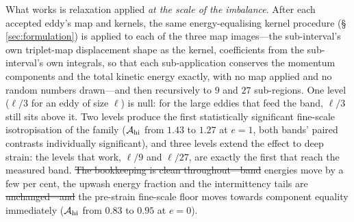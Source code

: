 \documentclass[lineno]{JFM-FLM_Au}
\providecommand{\DIFadd}[1]{{\protect\color{blue}\uwave{#1}}} %
\providecommand{\DIFdel}[1]{{\protect\color{red}\sout{#1}}} %
\providecommand{\DIFaddbegin}{} %
\providecommand{\DIFaddend}{} %
\providecommand{\DIFdelbegin}{} %
\providecommand{\DIFdelend}{} %
\begin{document}
What works is relaxation applied \emph{at the scale of the imbalance}.
After each accepted eddy's map and kernels, the same energy-equalising
kernel procedure (\S\,\ref{sec:formulation}) is applied to each of the
three map images---the sub-interval's own triplet-map displacement shape
as the kernel, coefficients from the sub-interval's own integrals, so
that each sub-application conserves the momentum components and the total
kinetic energy exactly, with no map applied and no random numbers
drawn---and then recursively to $9$ and $27$ sub-regions. One level
($\ell/3$ for an eddy of size $\ell$) is null: for the large eddies that
feed the band, $\ell/3$ still sits above it. Two levels produce the first
statistically significant fine-scale isotropisation of the family
($\mathcal A_{\rm hi}$ from $1.43$ to $1.27$ at $e=1$, both bands'
paired contrasts individually significant), and three levels extend the
effect to deep strain: the levels that work, $\ell/9$ and $\ell/27$, are
exactly the first that reach the measured band. \DIFdelbegin \DIFdel{The bookkeeping is clean
throughout---band }\DIFdelend \DIFaddbegin \DIFadd{Band }\DIFaddend energies move by \DIFaddbegin \DIFadd{only }\DIFaddend a few per cent, the upwash energy fraction and the intermittency tails are \DIFdelbegin \DIFdel{unchanged---and }\DIFdelend \DIFaddbegin \DIFadd{unchanged, and }\DIFaddend the pre-strain
fine-scale floor moves towards component equality immediately
($\mathcal A_{\rm hi}$ from $0.83$ to $0.95$ at $e=0$).
\end{document}
